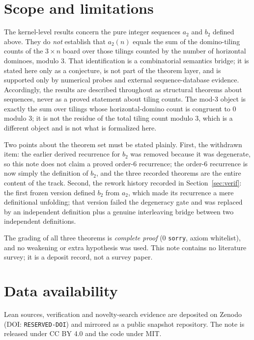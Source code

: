 \documentclass[11pt]{article}
\begin{document}
\section{Scope and limitations}
The kernel-level results concern the pure integer sequences $a_2$ and $b_2$ defined above.
They do \emph{not} establish that $a_2(n)$ equals the sum of the domino-tiling counts of the
$3\times n$ board over those tilings counted by the number of horizontal dominoes, modulo 3.
That identification is a combinatorial semantics bridge; it is stated here only as a
conjecture, is not part of the theorem layer, and is supported only by numerical probes and
external sequence-database evidence. Accordingly, the results are described throughout as
structural theorems about sequences, never as a proved statement about tiling counts.
The mod-3 object is exactly the sum over tilings whose horizontal-domino count is congruent
to $0$ modulo $3$; it is not the residue of the total tiling count modulo $3$, which is a
different object and is not what is formalized here.

Two points about the theorem set must be stated plainly. First, the withdrawn item: the
earlier derived recurrence for $b_2$ was removed because it was degenerate, so this note does
not claim a proved order-6 recurrence; the order-6 recurrence is now simply the definition of
$b_2$, and the three recorded theorems are the entire content of the track. Second, the
rework history recorded in Section~\ref{sec:verif}: the first frozen version defined $b_2$
from $a_2$, which made its recurrence a mere definitional unfolding; that version failed the
degeneracy gate and was replaced by an independent definition plus a genuine interleaving
bridge between two independent definitions.

The grading of all three theorems is \emph{complete proof} (0 \texttt{sorry}, axiom
whitelist), and no weakening or extra hypothesis was used. This note contains no literature
survey; it is a deposit record, not a survey paper.

\section*{Data availability}
Lean sources, verification and novelty-search evidence are deposited on Zenodo
(DOI: \texttt{RESERVED-DOI}) and mirrored as a public snapshot repository. The note is
released under CC BY 4.0 and the code under MIT.
\end{document}
